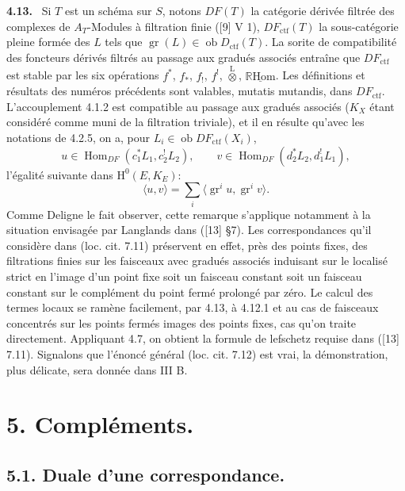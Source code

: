 \documentclass[11pt]{article}
\newenvironment{statement}[1]{\par\medskip\noindent\textbf{#1.}\ }{\par\medskip}
\renewcommand{\H}{\mathrm{H}}
\DeclareMathOperator{\Hom}{Hom}
\newcommand{\R}{\mathbb{R}}\newcommand{\RHomCore}{\mathbb{R}\mathrm{Hom}}
\newcommand{\ob}{\operatorname{ob}}
\providecommand{\RHom}{\RHomCore}
\providecommand{\uRHom}{\underline{\RHom}}
\providecommand{\Dctf}{D_{\mathrm{ctf}}}
\providecommand{\ctf}{\mathrm{ctf}}
\providecommand{\gr}{\operatorname{gr}}
\providecommand{\Dctf}{D_{\mathrm{ctf}}}
\providecommand{\RHom}{\RHomCore}
\providecommand{\Hom}{\operatorname{Hom}}
\providecommand{\ob}{\operatorname{ob}}
\providecommand{\gr}{\operatorname{gr}}
\providecommand{\gr}{\operatorname{gr}}
\providecommand{\RHom}{\R\mathcal{H}om}
\providecommand{\R}{\mathrm R}
\providecommand{\RHom}{\RHomCore}
\providecommand{\Hom}{\operatorname{Hom}}
\begin{document}
\begin{statement}{4.13}
Si $T$ est un schéma sur $S$, notons $DF(T)$ la catégorie dérivée filtrée des complexes de $A_T$-Modules à filtration finie ([9] V 1), $DF_{\ctf}(T)$ la sous-catégorie pleine formée des $L$ tels que $\gr(L)\in\ob\Dctf(T)$. La sorite de compatibilité des foncteurs dérivés filtrés au passage aux gradués associés entraîne que $DF_{\ctf}$ est stable par les six opérations $f^*$, $f_*$, $f_!$, $f^!$, $\overset{\mathrm{L}}{\otimes}$, $\uRHom$. Les définitions et résultats des numéros précédents sont valables, mutatis mutandis, dans $DF_{\ctf}$. L'accouplement 4.1.2 est compatible au passage aux gradués associés ($K_X$ étant considéré comme muni de la filtration triviale), et il en résulte qu'avec les notations de 4.2.5, on a, pour $L_i\in\ob DF_{\ctf}(X_i)$,
\[
u\in\Hom_{DF}(c_1^*L_1,c_2^!L_2),\qquad
v\in\Hom_{DF}(d_2^*L_2,d_1^!L_1),
\]
l'égalité suivante dans $\H^0(E,K_E)$:
\begin{equation}
\tag{4.13.1}
\langle u,v\rangle=\sum_i\langle \gr^i u,\gr^i v\rangle.
\end{equation}
Comme Deligne le fait observer, cette remarque s'applique notamment à la situation envisagée par Langlands dans ([13] §7). Les correspondances qu'il considère dans (loc. cit. 7.11) préservent en effet, près des points fixes, des filtrations finies sur les faisceaux avec gradués associés induisant sur le localisé strict en l'image d'un point fixe soit un faisceau constant soit un faisceau constant sur le complément du point fermé prolongé par zéro. Le calcul des termes locaux se ramène facilement, par 4.13, à 4.12.1 et au cas de faisceaux concentrés sur les points fermés images des points fixes, cas qu'on traite directement. Appliquant 4.7, on obtient la formule de lefschetz requise dans ([13] 7.11). Signalons que l'énoncé général (loc. cit. 7.12) est vrai, la démonstration, plus délicate, sera donnée dans III B.
\end{statement}



\section*{5. Compléments.}

\subsection*{5.1. Duale d'une correspondance.}
\end{document}
